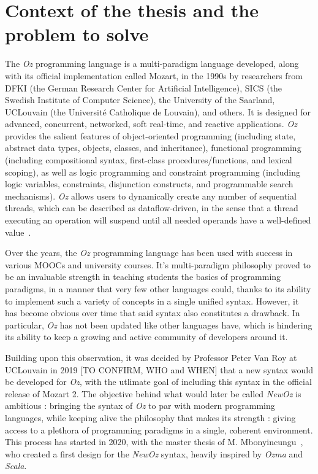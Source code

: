 
\section{Context of the thesis and the problem to solve}\label{sec:ch1-context}
The \textit{Oz} programming language is a multi-paradigm language developed, along with its official implementation called Mozart, in the 1990s by researchers from DFKI (the German Research Center for Artificial Intelligence), SICS (the Swedish Institute of Computer Science), the University of the Saarland, UCLouvain (the Université Catholique de Louvain), and others.
It is designed for advanced, concurrent, networked, soft real-time, and reactive applications.
\textit{Oz} provides the salient features of object-oriented programming (including state, abstract data types, objects, classes, and inheritance),
functional programming (including compositional syntax, first-class procedures/functions, and lexical scoping), as well as
logic programming and constraint programming (including logic variables, constraints, disjunction constructs, and programmable search mechanisms).
\textit{Oz} allows users to dynamically create any number of sequential threads, which can be described as dataflow-driven, in the sense that a thread executing an operation will suspend until all needed operands have a well-defined value~\cite{mozart2tutorial}.\newline

Over the years, the \textit{Oz} programming language has been used with success in various MOOCs and university courses.
It's multi-paradigm philosophy proved to be an invaluable strength in teaching students the basics of programming paradigms, in a manner that very few other languages could, thanks to its ability to implement such a variety of concepts in a single unified syntax.
However, it has become obvious over time that said syntax also constitutes a drawback.
In particular, \textit{Oz} has not been updated like other languages have, which is hindering its ability to keep a growing and active community of developers around it.\newline

Building upon this observation, it was decided by Professor Peter Van Roy at UCLouvain in 2019 [TO CONFIRM, WHO and WHEN] that a new syntax would be developed for \textit{Oz}, with the utlimate goal of including this syntax in the official release of Mozart 2.
The objective behind what would later be called \textit{NewOz} is ambitious : bringing the syntax of \textit{Oz} to par with modern programming languages, while keeping alive the philosophy that makes its strength : giving access to a plethora of programming paradigms in a single, coherent environment.
This process has started in 2020, with the master thesis of M. Mbonyincungu~\cite{jpthesis}, who created a first design for the \textit{NewOz} syntax, heavily inspired by \textit{Ozma} and \textit{Scala}.\newline

